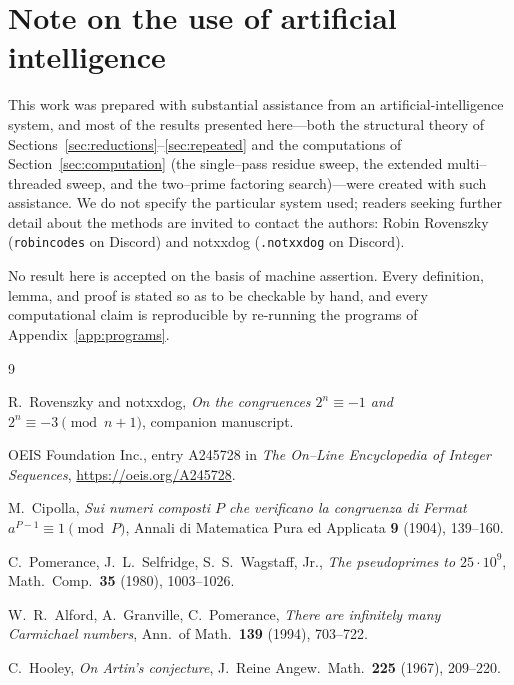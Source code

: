 \documentclass[11pt,reqno]{amsart}
\theoremstyle{plain}
\theoremstyle{definition}
\theoremstyle{remark}
\begin{document}
\section{Note on the use of artificial intelligence}\label{app:ai}
This work was prepared with substantial assistance from an artificial-intelligence system, and most of the results presented here---both the structural theory of Sections~\ref{sec:reductions}--\ref{sec:repeated} and the computations of Section~\ref{sec:computation} (the single--pass residue sweep, the extended multi--threaded sweep, and the two--prime factoring search)---were created with such assistance. We do not specify the particular system used; readers seeking further detail about the methods are invited to contact the authors: Robin Rovenszky (\texttt{robincodes} on Discord) and notxxdog (\texttt{.notxxdog} on Discord).

No result here is accepted on the basis of machine assertion. Every definition, lemma, and proof is stated so as to be checkable by hand, and every computational claim is reproducible by re-running the programs of Appendix~\ref{app:programs}.

\begin{thebibliography}{9}

R.~Rovenszky and notxxdog, \emph{On the congruences $2^{n}\equiv-1$ and $2^{n}\equiv-3\pmod{n+1}$}, companion manuscript.

OEIS Foundation Inc., entry A245728 in \emph{The On--Line Encyclopedia of Integer Sequences}, \url{https://oeis.org/A245728}.

M.~Cipolla, \emph{Sui numeri composti $P$ che verificano la congruenza di Fermat $a^{P-1}\equiv1\pmod P$}, Annali di Matematica Pura ed Applicata \textbf{9} (1904), 139--160.

C.~Pomerance, J.~L.~Selfridge, S.~S.~Wagstaff, Jr., \emph{The pseudoprimes to $25\cdot10^{9}$}, Math.\ Comp.\ \textbf{35} (1980), 1003--1026.

W.~R.~Alford, A.~Granville, C.~Pomerance, \emph{There are infinitely many Carmichael numbers}, Ann.\ of Math.\ \textbf{139} (1994), 703--722.

C.~Hooley, \emph{On Artin's conjecture}, J.\ Reine Angew.\ Math.\ \textbf{225} (1967), 209--220.

\end{thebibliography}
\end{document}
